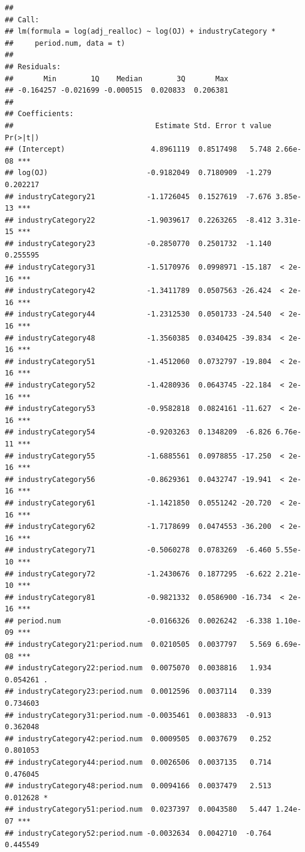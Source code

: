 \documentclass[
]{article}
\begin{document}
\begin{verbatim}
## 
## Call:
## lm(formula = log(adj_realloc) ~ log(OJ) + industryCategory * 
##     period.num, data = t)
## 
## Residuals:
##       Min        1Q    Median        3Q       Max 
## -0.164257 -0.021699 -0.000515  0.020833  0.206381 
## 
## Coefficients:
##                                 Estimate Std. Error t value Pr(>|t|)    
## (Intercept)                    4.8961119  0.8517498   5.748 2.66e-08 ***
## log(OJ)                       -0.9182049  0.7180909  -1.279 0.202217    
## industryCategory21            -1.1726045  0.1527619  -7.676 3.85e-13 ***
## industryCategory22            -1.9039617  0.2263265  -8.412 3.31e-15 ***
## industryCategory23            -0.2850770  0.2501732  -1.140 0.255595    
## industryCategory31            -1.5170976  0.0998971 -15.187  < 2e-16 ***
## industryCategory42            -1.3411789  0.0507563 -26.424  < 2e-16 ***
## industryCategory44            -1.2312530  0.0501733 -24.540  < 2e-16 ***
## industryCategory48            -1.3560385  0.0340425 -39.834  < 2e-16 ***
## industryCategory51            -1.4512060  0.0732797 -19.804  < 2e-16 ***
## industryCategory52            -1.4280936  0.0643745 -22.184  < 2e-16 ***
## industryCategory53            -0.9582818  0.0824161 -11.627  < 2e-16 ***
## industryCategory54            -0.9203263  0.1348209  -6.826 6.76e-11 ***
## industryCategory55            -1.6885561  0.0978855 -17.250  < 2e-16 ***
## industryCategory56            -0.8629361  0.0432747 -19.941  < 2e-16 ***
## industryCategory61            -1.1421850  0.0551242 -20.720  < 2e-16 ***
## industryCategory62            -1.7178699  0.0474553 -36.200  < 2e-16 ***
## industryCategory71            -0.5060278  0.0783269  -6.460 5.55e-10 ***
## industryCategory72            -1.2430676  0.1877295  -6.622 2.21e-10 ***
## industryCategory81            -0.9821332  0.0586900 -16.734  < 2e-16 ***
## period.num                    -0.0166326  0.0026242  -6.338 1.10e-09 ***
## industryCategory21:period.num  0.0210505  0.0037797   5.569 6.69e-08 ***
## industryCategory22:period.num  0.0075070  0.0038816   1.934 0.054261 .  
## industryCategory23:period.num  0.0012596  0.0037114   0.339 0.734603    
## industryCategory31:period.num -0.0035461  0.0038833  -0.913 0.362048    
## industryCategory42:period.num  0.0009505  0.0037679   0.252 0.801053    
## industryCategory44:period.num  0.0026506  0.0037135   0.714 0.476045    
## industryCategory48:period.num  0.0094166  0.0037479   2.513 0.012628 *  
## industryCategory51:period.num  0.0237397  0.0043580   5.447 1.24e-07 ***
## industryCategory52:period.num -0.0032634  0.0042710  -0.764 0.445549    

\end{verbatim}
\end{document}
